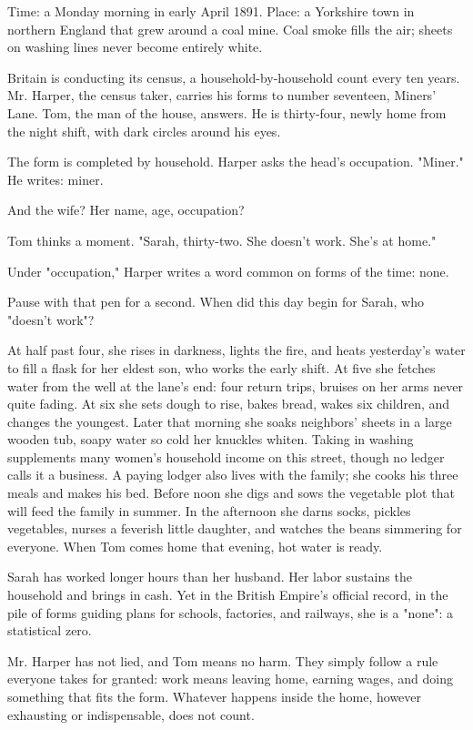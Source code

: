 Time: a Monday morning in early April 1891. Place: a Yorkshire town in northern England that grew around a coal mine. Coal smoke fills the air; sheets on washing lines never become entirely white.

Britain is conducting its census, a household-by-household count every ten years. Mr. Harper, the census taker, carries his forms to number seventeen, Miners' Lane. Tom, the man of the house, answers. He is thirty-four, newly home from the night shift, with dark circles around his eyes.

The form is completed by household. Harper asks the head's occupation. "Miner." He writes: miner.

And the wife? Her name, age, occupation?

Tom thinks a moment. "Sarah, thirty-two. She doesn't work. She's at home."

Under "occupation," Harper writes a word common on forms of the time: none.

Pause with that pen for a second. When did this day begin for Sarah, who "doesn't work"?

At half past four, she rises in darkness, lights the fire, and heats yesterday's water to fill a flask for her eldest son, who works the early shift. At five she fetches water from the well at the lane's end: four return trips, bruises on her arms never quite fading. At six she sets dough to rise, bakes bread, wakes six children, and changes the youngest. Later that morning she soaks neighbors' sheets in a large wooden tub, soapy water so cold her knuckles whiten. Taking in washing supplements many women's household income on this street, though no ledger calls it a business. A paying lodger also lives with the family; she cooks his three meals and makes his bed. Before noon she digs and sows the vegetable plot that will feed the family in summer. In the afternoon she darns socks, pickles vegetables, nurses a feverish little daughter, and watches the beans simmering for everyone. When Tom comes home that evening, hot water is ready.

Sarah has worked longer hours than her husband. Her labor sustains the household and brings in cash. Yet in the British Empire's official record, in the pile of forms guiding plans for schools, factories, and railways, she is a "none": a statistical zero.

Mr. Harper has not lied, and Tom means no harm. They simply follow a rule everyone takes for granted: work means leaving home, earning wages, and doing something that fits the form. Whatever happens inside the home, however exhausting or indispensable, does not count.

